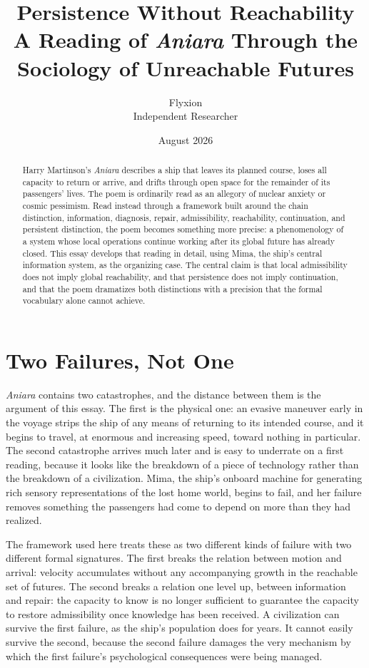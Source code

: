 \documentclass[11pt]{article}
\title{Persistence Without Reachability\\
\large A Reading of \emph{Aniara} Through the Sociology of Unreachable Futures}
\author{Flyxion\\ \small Independent Researcher}
\date{August 2026}
\begin{document}
\maketitle

\begin{abstract}
Harry Martinson's \emph{Aniara} describes a ship that leaves its planned course, loses all capacity to return or arrive, and drifts through open space for the remainder of its passengers' lives. The poem is ordinarily read as an allegory of nuclear anxiety or cosmic pessimism. Read instead through a framework built around the chain distinction, information, diagnosis, repair, admissibility, reachability, continuation, and persistent distinction, the poem becomes something more precise: a phenomenology of a system whose local operations continue working after its global future has already closed. This essay develops that reading in detail, using Mima, the ship's central information system, as the organizing case. The central claim is that local admissibility does not imply global reachability, and that persistence does not imply continuation, and that the poem dramatizes both distinctions with a precision that the formal vocabulary alone cannot achieve.
\end{abstract}

\section{Two Failures, Not One}

\emph{Aniara} contains two catastrophes, and the distance between them is the argument of this essay. The first is the physical one: an evasive maneuver early in the voyage strips the ship of any means of returning to its intended course, and it begins to travel, at enormous and increasing speed, toward nothing in particular. The second catastrophe arrives much later and is easy to underrate on a first reading, because it looks like the breakdown of a piece of technology rather than the breakdown of a civilization. Mima, the ship's onboard machine for generating rich sensory representations of the lost home world, begins to fail, and her failure removes something the passengers had come to depend on more than they had realized.

The framework used here treats these as two different kinds of failure with two different formal signatures. The first breaks the relation between motion and arrival: velocity accumulates without any accompanying growth in the reachable set of futures. The second breaks a relation one level up, between information and repair: the capacity to know is no longer sufficient to guarantee the capacity to restore admissibility once knowledge has been received. A civilization can survive the first failure, as the ship's population does for years. It cannot easily survive the second, because the second failure damages the very mechanism by which the first failure's psychological consequences were being managed.
\end{document}
